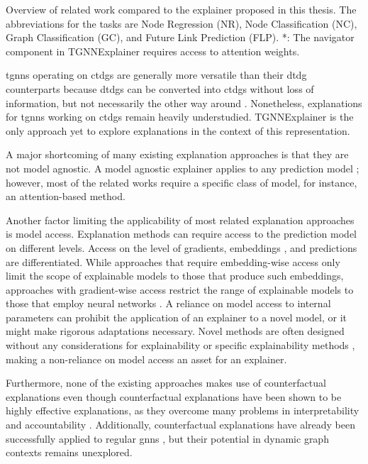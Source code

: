 \begin{table}[ht]
    \centering
    \footnotesize
    
    \caption{Overview of related work compared to the explainer proposed in this thesis. The abbreviations for the tasks are Node Regression (NR), Node Classification (NC), Graph Classification (GC), and Future Link Prediction (FLP). *: The navigator component in TGNNExplainer requires access to attention weights.}
    \label{t_relatedWork_Overview}
\end{table}

\glspl{tgnn} operating on \glspl{ctdg} are generally more versatile than their \gls{dtdg} counterparts because \glspl{dtdg} can be converted into \glspl{ctdg} without loss of information, but not necessarily the other way around \cite{souza_provably_2022}. Nonetheless, explanations for \glspl{tgnn} working on \glspl{ctdg} remain heavily understudied. TGNNExplainer \cite{xia_explaining_2023} is the only approach yet to explore explanations in the context of this representation.

A major shortcoming of many existing explanation approaches is that they are not model agnostic. A model agnostic explainer applies to any prediction model \cite{prado-romero_survey_2023}; however, most of the related works require a specific class of model, for instance, an attention-based method.

Another factor limiting the applicability of most related explanation approaches is model access. Explanation methods can require access to the prediction model on different levels. Access on the level of gradients, embeddings \cite{verma_counterfactual_2020}, and predictions are differentiated. While approaches that require embedding-wise access only limit the scope of explainable models to those that produce such embeddings, approaches with gradient-wise access restrict the range of explainable models to those that employ neural networks \cite{prado-romero_survey_2023}. A reliance on model access to internal parameters can prohibit the application of an explainer to a novel model, or it might make rigorous adaptations necessary. Novel methods are often designed without any considerations for explainability or specific explainability methods \cite{xia_explaining_2023}, making a non-reliance on model access an asset for an explainer.

Furthermore, none of the existing approaches makes use of counterfactual explanations even though counterfactual explanations have been shown to be highly effective explanations, as they overcome many problems in interpretability and accountability \cite{wachter_counterfactual_2018}. Additionally, counterfactual explanations have already been successfully applied to regular \glspl{gnn} \cite{tan_learning_2022, lucic_cf-gnnexplainer_2022}, but their potential in dynamic graph contexts remains unexplored.

